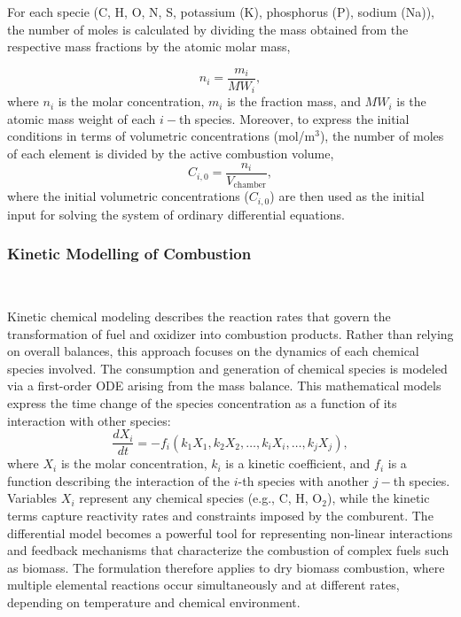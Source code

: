 \documentclass[preprint,12pt]{elsarticle}
\begin{document}
For each specie (C, H, O, N, S, potassium (K), phosphorus (P), sodium (Na)), the number of moles is calculated by dividing the mass obtained from the respective mass fractions by the atomic molar mass,

\begin{equation}
\label{mol}
n_i = \frac{m_i}{MW_i},
\end{equation}
where $n_i$ is the molar concentration, $m_i$ is the fraction mass, and $MW_i$ is the atomic mass weight of each $i-$th species. Moreover, to express the initial conditions in terms of volumetric concentrations (mol/m$^3$), the number of moles of each element is divided by the active combustion volume,
\begin{equation}
\label{volumetricX}
C_{i,0} = \frac{n_i}{V_{\text{chamber}}},
\end{equation}
where the initial volumetric concentrations ($C_{i,0}$) are then used as the initial input for solving the system of ordinary differential equations.

\subsubsection{Kinetic Modelling of Combustion}\\
\label{Kinetic Modelling of Comustion}

Kinetic chemical modeling describes the reaction rates that govern the transformation of fuel and oxidizer into combustion products. Rather than relying on overall balances, this approach focuses on the dynamics of each chemical species involved. 
The consumption and generation of chemical species is modeled via a first-order ODE arising from the mass balance. This mathematical models express the time change of the species concentration as a function of its interaction with other species:
\begin{equation}
    \frac{dX_i}{dt} = - f_i (k_1 X_1,k_2X_2,\ldots,k_iX_i,\ldots,k_jX_j),
\end{equation}
where $X_i$ is the molar concentration, $k_i$ is a kinetic coefficient, and $f_i$ is a function describing the interaction of the $i$-th species with another $j-$th species.\\

Variables $X_i$ represent any chemical species (e.g., C, H, O$_2$), while the kinetic terms capture reactivity rates and constraints imposed by the comburent. The differential model becomes a powerful tool for representing non-linear interactions and feedback mechanisms that characterize the combustion of complex fuels such as biomass. The formulation therefore applies to dry biomass combustion, where multiple elemental reactions occur simultaneously and at different rates, depending on temperature and chemical environment.\\
\end{document}
